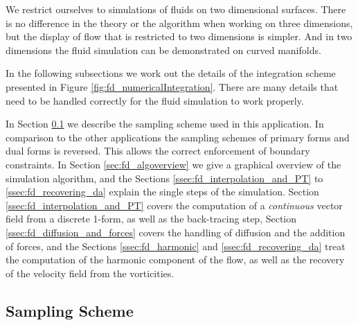 We restrict ourselves to simulations of fluids on two dimensional surfaces. There is no difference in the theory or the algorithm when working on three dimensions, but the display of flow that is restricted to two dimensions is simpler. And in two dimensions the fluid simulation can be demonstrated on curved manifolds. 

In the following subsections we work out the details of the integration scheme presented  in Figure \ref{fig:fd_numericalIntegration}.  There are many details that need to be handled correctly for the fluid simulation to work properly. 

In Section \ref{sec:fd_samplingscheme} we describe the sampling scheme used in this application. In comparison to the other applications the sampling schemes of primary forms and dual forms is reversed. This allows the correct enforcement of boundary constraints. In Section \ref{sec:fd_algoverview} we give a graphical overview of the simulation algorithm, and the Sections \ref{ssec:fd_interpolation_and_PT} to \ref{ssec:fd_recovering_da} explain the single steps of the simulation.
Section \ref{ssec:fd_interpolation_and_PT} covers the computation of a \emph{continuous} vector field from a discrete 1-form, as well as the back-tracing step, Section \ref{ssec:fd_diffusion_and_forces} covers the handling of diffusion and the addition of forces, and the Sections \ref{ssec:fd_harmonic} and \ref{ssec:fd_recovering_da} treat the computation of the harmonic component of the flow, as well as the recovery of the velocity field from the vorticities.


\subsection{Sampling Scheme}
\label{sec:fd_samplingscheme}

